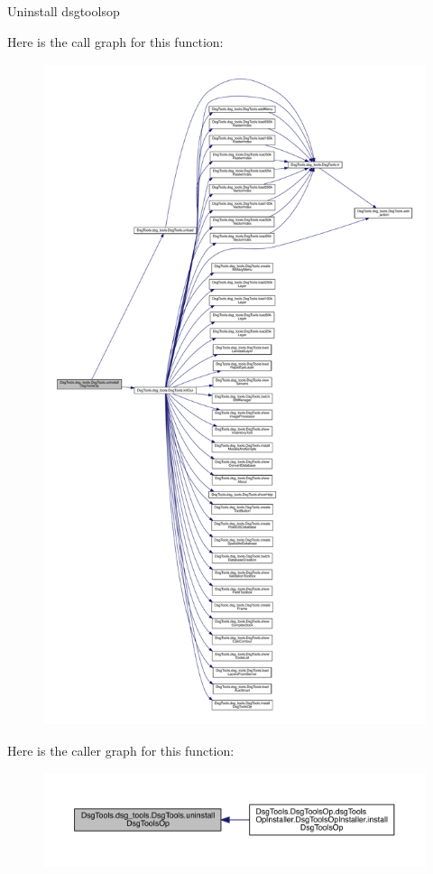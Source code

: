 \begin{DoxyVerb}Uninstall dsgtoolsop
\end{DoxyVerb}
 Here is the call graph for this function\+:
\nopagebreak
\begin{figure}[H]
\begin{center}
\leavevmode
\includegraphics[height=550pt]{class_dsg_tools_1_1dsg__tools_1_1_dsg_tools_a3110b80e4009faa9ca49631bc96147eb_cgraph}
\end{center}
\end{figure}
Here is the caller graph for this function\+:
\nopagebreak
\begin{figure}[H]
\begin{center}
\leavevmode
\includegraphics[width=350pt]{class_dsg_tools_1_1dsg__tools_1_1_dsg_tools_a3110b80e4009faa9ca49631bc96147eb_icgraph}
\end{center}
\end{figure}
